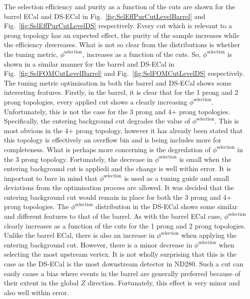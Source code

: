 The selection efficiency and purity as a function of the cuts are shown for the barrel ECal and DS-ECal in Fig.~\ref{fig:SelEffPurCutLevelBarrel} and Fig.~\ref{fig:SelEffPurCutLevelDS} respectively.  Every cut which is relevant to a prong topology has an expected effect, the purity of the sample increases while the efficiency drecreases.  What is not so clear from the distributions is whether the tuning metric, $\phi^{\textrm{selection}}$, increases as a function of the cuts.  So, $\phi^{\textrm{selection}}$ is shown in a similar manner for the barrel and DS-ECal in Fig.~\ref{fig:SelFOMCutLevelBarrel} and Fig.~\ref{fig:SelFOMCutLevelDS} respectively.  The tuning metric optimisation in both the barrel and DS-ECal shows some interesting features.  Firstly, in the barrel, it is clear that for the 1 prong and 2 prong topologies, every applied cut shows a clearly increasing $\phi^{\textrm{selection}}$.  Unfortunately, this is not the case for the 3 prong and 4+ prong topologies.  Specifically, the entering background cut degrades the value of $\phi^{\textrm{selection}}$.  This is most obvious in the 4+ prong topology, however it has already been stated that this topology is effectively an overflow bin and is being includes more for completeness.  What is perhaps more concerning is the degredation of $\phi^{\textrm{selection}}$ in the 3 prong topology.  Fortunately, the decrease in $\phi^{\textrm{selection}}$ is small when the entering background cut is appliedi and the change is well within error.  It is important to bare in mind that $\phi^{\textrm{selection}}$ is used as a tuning guide and small deviations from the optimisation process are allowed.  It was decided that the entering background cut would remain in place for both the 3 prong and 4+ prong topologies.  The $\phi^{\textrm{selection}}$ distribution in the DS-ECal shows some similar and different features to that of the barrel.  As with the barrel ECal case, $\phi^{\textrm{selection}}$ clearly increases as a function of the cuts for the 1 prong and 2 prong topologies.  Unlike the barrel ECal, there is also an increase in $\phi^{\textrm{selection}}$ when applying the entering background cut.  However, there is a minor decrease in $\phi^{\textrm{selection}}$ when selecting the most upstream vertex.  It is not wholly surprising that this is the case as the DS-ECal is the most downstream detector in ND280.  Such a cut can easily cause a bias where events in the barrel are generally preferred because of their extent in the global $Z$ direction.  Fortunately, this effect is very minor and also well within error.  
